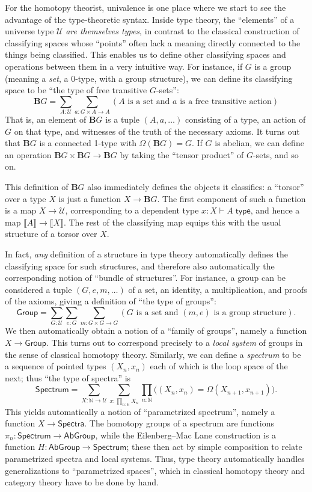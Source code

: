 \documentclass[12pt]{article}
\def\ty{\;\mathsf{type}}
\def\m#1{\llbracket#1\rrbracket}
\def\N{\mathbb{N}}
\def\types{\vdash}
\def\U{\mathscr{U}}
\numberwithin{equation}{section}
\begin{document}
For the homotopy theorist, univalence is one place where we start to see the advantage of the type-theoretic syntax.
Inside type theory, the ``elements'' of a universe type $\U$ \emph{are themselves types}, in contrast to the classical construction of classifying spaces whose ``points'' often lack a meaning directly connected to the things being classified.
This enables us to define other classifying spaces and operations between them in a very intuitive way.
For instance, if $G$ is a group (meaning a \emph{set}, a 0-type, with a group structure), we can define its classifying space to be ``the type of free transitive $G$-sets'':
\[ \mathbf{B}G = \textstyle\sum_{A:\U} \sum_{a:G\times A\to A} (\text{$A$ is a set and $a$ is a free transitive action}) \]
That is, an element of $\mathbf{B}G$ is a tuple $(A,a,\dots)$ consisting of a type, an action of $G$ on that type, and witnesses of the truth of the necessary axioms.
It turns out that $\mathbf{B}G$ is a connected 1-type with $\Omega(\mathbf{B}G) = G$.
If $G$ is abelian, we can define an operation $\mathbf{B}G \times \mathbf{B}G \to \mathbf{B}G$ by taking the ``tensor product'' of $G$-sets, and so on.

This definition of $\mathbf{B}G$ also immediately defines the objects it classifies: a ``torsor'' over a type $X$ is just a function $X \to \mathbf{B}G$.
The first component of such a function is a map $X\to \U$, corresponding to a dependent type $x:X \types A\ty$, and hence a map $\m A \to \m X$.
The rest of the classifying map equips this with the usual structure of a torsor over $X$.

In fact, \emph{any} definition of a structure in type theory automatically defines the classifying space for such structures, and therefore also automatically the corresponding notion of ``bundle of structures''.
For instance, a group can be considered a tuple $(G,e,m,\dots)$ of a set, an identity, a multiplication, and proofs of the axioms, giving a definition of ``the type of groups'':
\[ \mathsf{Group} = \textstyle \sum_{G:\U}\sum_{e:G} \sum_{m:G\times G\to G} (\text{$G$ is a set and $(m,e)$ is a group structure}). \]
We then automatically obtain a notion of a ``family of groups'', namely a function $X\to \mathsf{Group}$.
This turns out to correspond precisely to a \emph{local system} of groups in the sense of classical homotopy theory.
Similarly, we can define a \emph{spectrum} to be a sequence of pointed types $(X_n,x_n)$ each of which is the loop space of the next; thus ``the type of spectra'' is
\[ \mathsf{Spectrum} = \textstyle\sum_{X:\N\to \U} \sum_{x:\prod_{n:\N} X_n} \prod_{n:\N} \big((X_n,x_n) = \Omega(X_{n+1},x_{n+1})\big). \]
This yields automatically a notion of ``parametrized spectrum'', namely a function $X\to \mathsf{Spectra}$.
The homotopy groups of a spectrum are functions $\pi_n:\mathsf{Spectrum} \to \mathsf{AbGroup}$, while the Eilenberg--Mac Lane construction is a function $H : \mathsf{AbGroup} \to \mathsf{Spectrum}$; these then act by simple composition to relate parametrized spectra and local systems.
Thus, type theory automatically handles generalizations to ``parametrized spaces'', which in classical homotopy theory and category theory have to be done by hand.
\end{document}
